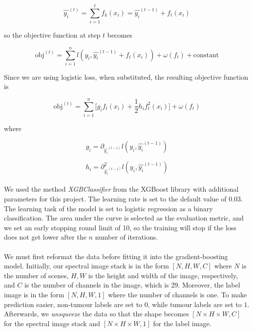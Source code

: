 \documentclass[12pt,oneside]{report}
\begin{document}
\begin{equation}
    \hat{y_i}^{(t)} =
    \sum_{i=1}^t f_k (x_i) =
    \hat{y_i}^{(t-1)} + f_t (x_i)
\end{equation}

so the objective function at step $t$ becomes

\begin{equation}
    \text{obj}^{(t)} =
    \sum_{i=1}^n l(y_i, \hat{y_i}^{(t-1)} + f_t (x_i)) +
    \omega (f_t) + \text{constant}
\end{equation}

Since we are using logistic loss, when substituted, the resulting objective function is

\begin{equation}
    \text{obj}^{(t)} =
    \sum_{i=1}^n 
    \biggl[
        g_i f_t (x_i) +
        \frac{1}{2} h_i f_t^2 (x_i)
    \biggr] +
    \omega (f_t)
\end{equation}

where

\begin{equation}
    g_i =
    \partial_{\hat{y_i}^{(t-1)}}
    l(y_i, \hat{y_i}^{(t-1)})
\end{equation}

\begin{equation}
    h_i =
    \partial_{\hat{y_i}^{(t-1)}}^2
    l(y_i, \hat{y_i}^{(t-1)})
\end{equation}

\paragraph{}
We used the method \textit{XGBClassifier} from the XGBoost library \cite{chen_xgboost_2016} with additional parameters for this project. The learning rate is set to the default value of $0.03$. The learning task of the model is set to logistic regression as a binary classification. The area under the curve is selected as the evaluation metric, and we set an early stopping round limit of 10, so the training will stop if the loss does not get lower after the $n$ number of iterations.

\paragraph{}
We must first reformat the data before fitting it into the gradient-boosting model. Initially, our spectral image stack is in the form $[ N, H, W, C]$ where $N$ is the number of scenes, $H, W$ is the height and width of the image, respectively, and $C$ is the number of channels in the image, which is 29. Moreover, the label image is in the form $[N, H, W, 1]$ where the number of channels is one. To make prediction easier, non-tumour labels are set to $0$, while tumour labels are set to $1$. Afterwards, we \textit{unsqueeze} the data so that the shape becomes $[N \times H \times W, C]$ for the spectral image stack and $[N \times H \times W, 1]$ for the label image.
\end{document}
